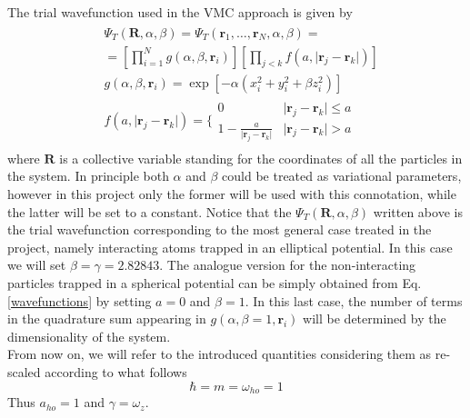 The trial wavefunction used in the VMC approach is given by
\begin{align}
\begin{split}
    &\Psi_T(\bm{R},\alpha, \beta) = \Psi_T(\bm{r}_1, \dots, \bm{r}_N, \alpha, \beta) = \\
    &= \left[ \prod_{i=1}^N g(\alpha, \beta, \bm{r}_i) \right]  \left[ \prod_{j<k} f(a, \vert \bm{r}_j - \bm{r}_k \vert ) \right] \\
    &g(\alpha, \beta, \bm{r}_i) = \exp \left[ -\alpha \left( x_i^2 + y_i^2 + \beta z_i^2 \right) \right] \\
    &f(a, \vert \bm{r}_j - \bm{r}_k \vert ) = \Bigg\{ \begin{array}{ll}
        0 & \vert \bm{r}_j - \bm{r}_k \vert \leq a \\
        1 - \frac{a}{\vert \bm{r}_j - \bm{r}_k \vert} & \vert \bm{r}_j - \bm{r}_k \vert > a
    \end{array}
\end{split}
\label{wavefunctions}
\end{align}
where $\bm{R}$ is a collective variable standing for the coordinates of all the particles in the system. In principle both $\alpha$ and $\beta$ could be treated as variational parameters, however in this project only the former will be used with this connotation, while the latter will be set to a constant. Notice that the $\Psi_T(\bm{R},\alpha,\beta)$ written above is the trial wavefunction corresponding to the most general case treated in the project, namely interacting atoms trapped in an elliptical potential. In this case we will set $\beta = \gamma = 2.82843$. The analogue version for the non-interacting particles trapped in a spherical potential can be simply obtained from Eq.\,\ref{wavefunctions} by setting $a=0$ and $\beta=1$. In this last case, the number of terms in the quadrature sum appearing in $g(\alpha, \beta=1, \bm{r}_i)$ will be determined by the dimensionality of the system. \\

From now on, we will refer to the introduced quantities considering them as re-scaled according to what follows
\begin{equation*}
    \hbar = m = \omega_{ho} = 1
\end{equation*}
Thus $a_{ho}=1$ and $\gamma = \omega_z$.

